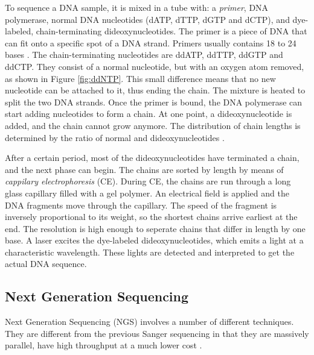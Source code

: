 \documentclass[../main/thesis.tex]{subfiles}
\begin{document}
To sequence a DNA sample, it is mixed in a tube with: a \textit{primer}, DNA polymerase, normal DNA nucleotides (dATP, dTTP, dGTP and dCTP), and dye-labeled, chain-terminating dideoxynucleotides.
The primer is a piece of DNA that can fit onto a specific spot of a DNA strand.
Primers usually contains 18 to 24 bases \cite{sanger_primer_size}.
The chain-terminating nucleotides are ddATP, ddTTP, ddGTP and ddCTP.
They consist of a normal nucleotide, but with an oxygen atom removed, as shown in Figure \ref{fig:ddNTP}.
This small difference means that no new nucleotide can be attached to it, thus ending the chain.
The mixture is heated to split the two DNA strands.
Once the primer is bound, the DNA polymerase can start adding nucleotides to form a chain.
At one point, a dideoxynucleotide is added, and the chain cannot grow anymore.
The distribution of chain lengths is determined by the ratio of normal and dideoxynucleotides \cite{sanger_ratio}.

After a certain period, most of the dideoxynucleotides have terminated a chain, and the next phase can begin.
The chains are sorted by length by means of \textit{cappilary electrophoresis} (CE).
During CE, the chains are run through a long glass capillary filled with a gel polymer.
An electrical field is applied and the DNA fragments move through the capillary.
The speed of the fragment is inversely proportional to its weight, so the shortest chains arrive earliest at the end.
The resolution is high enough to seperate chains that differ in length by one base.
A laser excites the dye-labeled dideoxynucleotides, which emits a light at a characteristic wavelength.
These lights are detected and interpreted to get the actual DNA sequence.


\subsection{Next Generation Sequencing}
Next Generation Sequencing (NGS) involves a number of different techniques.
They are different from the previous Sanger sequencing in that they are massively parallel, have high throughput at a much lower cost \cite{ngs_history}.

\end{document}
